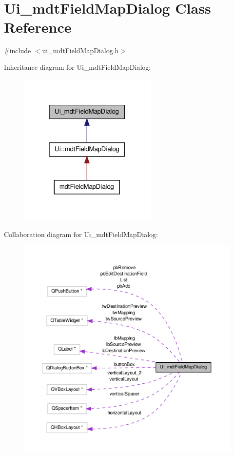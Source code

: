 \hypertarget{class_ui__mdt_field_map_dialog}{\section{Ui\-\_\-mdt\-Field\-Map\-Dialog Class Reference}
\label{class_ui__mdt_field_map_dialog}
}


{\ttfamily \#include $<$ui\-\_\-mdt\-Field\-Map\-Dialog.\-h$>$}



Inheritance diagram for Ui\-\_\-mdt\-Field\-Map\-Dialog\-:
\nopagebreak
\begin{figure}[H]
\begin{center}
\leavevmode
\includegraphics[width=196pt]{class_ui__mdt_field_map_dialog__inherit__graph}
\end{center}
\end{figure}


Collaboration diagram for Ui\-\_\-mdt\-Field\-Map\-Dialog\-:
\nopagebreak
\begin{figure}[H]
\begin{center}
\leavevmode
\includegraphics[width=350pt]{class_ui__mdt_field_map_dialog__coll__graph}
\end{center}
\end{figure}
